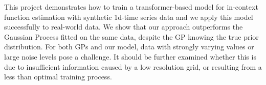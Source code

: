 This project demonstrates how to train a transformer-based model for in-context function estimation with synthetic 1d-time series data and we apply this model successfully to real-world data. We show that our approach outperforms the Gaussian Process fitted on the same data, despite the GP knowing the true prior distribution. For both GPs and our model, data with strongly varying values or large noise levels pose a challenge. It should be further examined whether this is due to insufficient information caused by a low resolution grid, or resulting from a less than optimal training process.